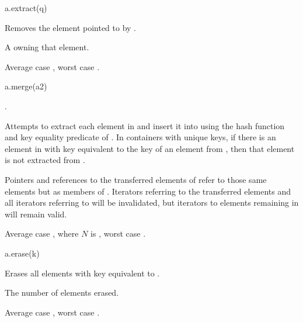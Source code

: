 %
\begin{itemdecl}
a.extract(q)
\end{itemdecl}

\begin{itemdescr}
\pnum
\result
{}

\pnum
\effects
Removes the element pointed to by .

\pnum
\returns
A  owning that element.

\pnum
\complexity
Average case , worst case .
\end{itemdescr}

%
\begin{itemdecl}
a.merge(a2)
\end{itemdecl}

\begin{itemdescr}
\pnum
\result
{}

\pnum
\expects
{}.

\pnum
\effects
Attempts to extract each element in  and insert it into 
using the hash function and key equality predicate of .
In containers with unique keys, if there is an element in 
with key equivalent to the key of an element from ,
then that element is not extracted from .

\pnum
\ensures
Pointers and references to the transferred elements of  refer to
those same elements but as members of .
Iterators referring to the transferred elements and
all iterators referring to  will be invalidated,
but iterators to elements remaining in  will remain valid.

\pnum
\complexity
Average case , where $N$ is ,
worst case .
\end{itemdescr}

%
\begin{itemdecl}
a.erase(k)
\end{itemdecl}

\begin{itemdescr}
\pnum
\result
{}

\pnum
\effects
Erases all elements with key equivalent to .

\pnum
\returns
The number of elements erased.

\pnum
\complexity
Average case , worst case .
\end{itemdescr}


